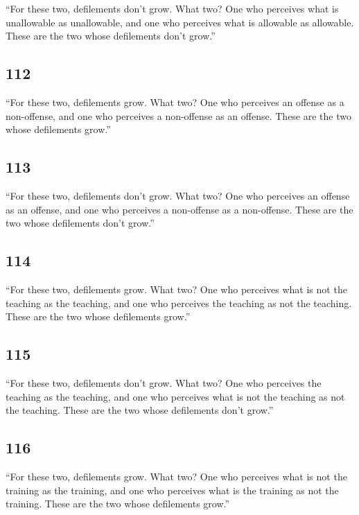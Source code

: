 \documentclass[12pt,openany]{book}%
\begin{document}
“For these two, defilements don’t grow. What two? One who perceives what is unallowable as unallowable, and one who perceives what is allowable as allowable. These are the two whose defilements don’t grow.” 

\subsection*{112 }

“For these two, defilements grow. What two? One who perceives an offense as a non-offense, and one who perceives a non-offense as an offense. These are the two whose defilements grow.” 

\subsection*{113 }

“For these two, defilements don’t grow. What two? One who perceives an offense as an offense, and one who perceives a non-offense as a non-offense. These are the two whose defilements don’t grow.” 

\subsection*{114 }

“For these two, defilements grow. What two? One who perceives what is not the teaching as the teaching, and one who perceives the teaching as not the teaching. These are the two whose defilements grow.” 

\subsection*{115 }

“For these two, defilements don’t grow. What two? One who perceives the teaching as the teaching, and one who perceives what is not the teaching as not the teaching. These are the two whose defilements don’t grow.” 

\subsection*{116 }

“For these two, defilements grow. What two? One who perceives what is not the training as the training, and one who perceives what is the training as not the training. These are the two whose defilements grow.” 
\end{document}

